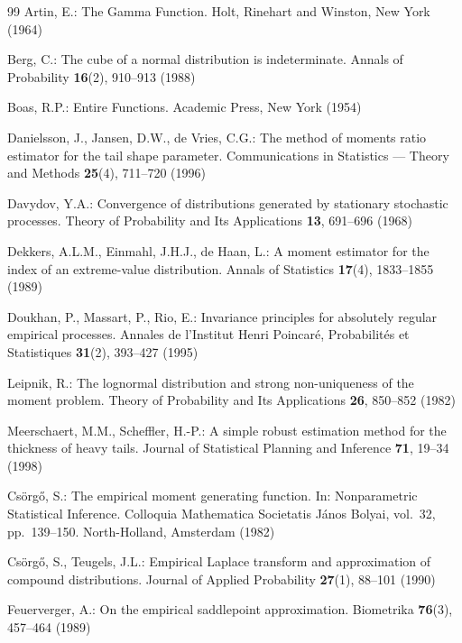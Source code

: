 \documentclass[sn-mathphys-num]{sn-jnl}
\theoremstyle{thmstyleone}%
\theoremstyle{thmstyletwo}%
\theoremstyle{thmstylethree}%
\theoremstyle{thmstyleone}%
\begin{document}
\begin{thebibliography}{99}
		Artin, E.: The Gamma Function. Holt, Rinehart and Winston, New
		York (1964)
		
		Berg, C.: The cube of a normal distribution is indeterminate.
		Annals of Probability \textbf{16}(2), 910--913 (1988)
		
		Boas, R.P.: Entire Functions. Academic Press, New York (1954)
		
		Danielsson, J., Jansen, D.W., de Vries, C.G.: The method of
		moments ratio estimator for the tail shape parameter.
		Communications in Statistics --- Theory and Methods
		\textbf{25}(4), 711--720 (1996)
		
		Davydov, Y.A.: Convergence of distributions generated by
		stationary stochastic processes. Theory of Probability and Its
		Applications \textbf{13}, 691--696 (1968)
		
		Dekkers, A.L.M., Einmahl, J.H.J., de Haan, L.: A moment
		estimator for the index of an extreme-value distribution.
		Annals of Statistics \textbf{17}(4), 1833--1855 (1989)
		
		Doukhan, P., Massart, P., Rio, E.: Invariance principles for
		absolutely regular empirical processes. Annales de l'Institut
		Henri Poincar\'e, Probabilit\'es et Statistiques
		\textbf{31}(2), 393--427 (1995)
		
		Leipnik, R.: The lognormal distribution and strong
		non-uniqueness of the moment problem. Theory of Probability and
		Its Applications \textbf{26}, 850--852 (1982)
		
		Meerschaert, M.M., Scheffler, H.-P.: A simple robust estimation
		method for the thickness of heavy tails. Journal of Statistical
		Planning and Inference \textbf{71}, 19--34 (1998)
		
		Cs\"org\H{o}, S.: The empirical moment generating function.
		In: Nonparametric Statistical Inference. Colloquia Mathematica
		Societatis J\'anos Bolyai, vol.~32, pp.~139--150.
		North-Holland, Amsterdam (1982)
		
		Cs\"org\H{o}, S., Teugels, J.L.: Empirical Laplace transform
		and approximation of compound distributions. Journal of Applied
		Probability \textbf{27}(1), 88--101 (1990)
		
		Feuerverger, A.: On the empirical saddlepoint approximation.
		Biometrika \textbf{76}(3), 457--464 (1989)
		

\end{thebibliography}
\end{document}
